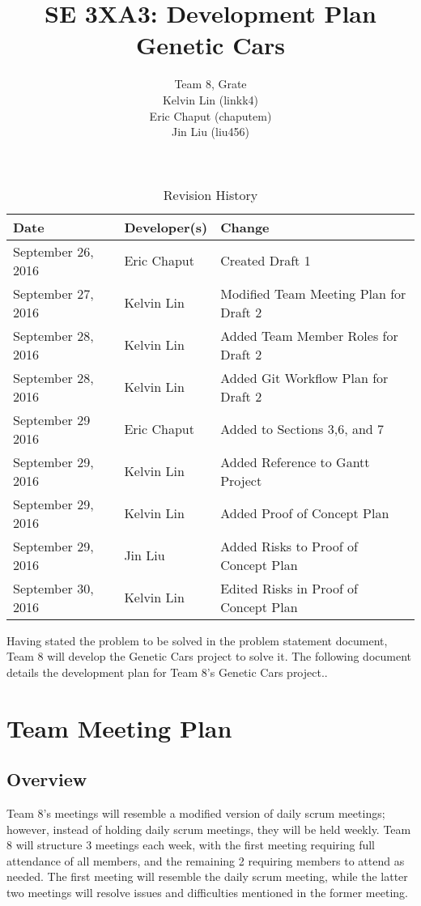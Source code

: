 \documentclass{article}
\title{SE 3XA3: Development Plan\\Genetic Cars}
\author{Team 8, Grate
		\\ Kelvin Lin (linkk4)
		\\ Eric Chaput (chaputem)
		\\ Jin Liu (liu456)
}
\date{}
\begin{document}
\begin{table}[hp]
\caption{Revision History} \label{TblRevisionHistory}
\begin{tabularx}{\textwidth}{llX}
\toprule
\textbf{Date} & \textbf{Developer(s)} & \textbf{Change}\\
\midrule
September 26, 2016 & Eric Chaput & Created Draft 1\\
September 27, 2016 & Kelvin Lin & Modified Team Meeting Plan for Draft 2\\
September 28, 2016 & Kelvin Lin & Added Team Member Roles for Draft 2\\
September 28, 2016 & Kelvin Lin & Added Git Workflow Plan for Draft 2\\
September 29 2016 & Eric Chaput & Added to Sections 3,6, and 7\\
September 29, 2016 & Kelvin Lin & Added Reference to Gantt Project\\
September 29, 2016 & Kelvin Lin & Added Proof of Concept Plan\\
September 29, 2016 & Jin Liu & Added Risks to Proof of Concept Plan\\
September 30, 2016 & Kelvin Lin & Edited Risks in Proof of Concept Plan\\
\bottomrule
\end{tabularx}
\end{table}

\newpage

\maketitle


Having stated the problem to be solved in the problem statement document, Team 8 
will develop the Genetic Cars project to solve it. The following document 
details the development plan for Team 8's Genetic Cars project..

\section{Team Meeting Plan}

\subsection{Overview}
Team 8's meetings will resemble a modified version of daily scrum meetings; 
however, instead of holding daily scrum meetings, they will be held weekly. Team 
8 will structure 3 meetings each week, with the first meeting requiring full 
attendance of all members, and the remaining 2 requiring members to attend as 
needed. The first meeting will resemble the daily scrum meeting, while the 
latter two meetings will resolve issues and difficulties mentioned in the former 
meeting.
\end{document}
